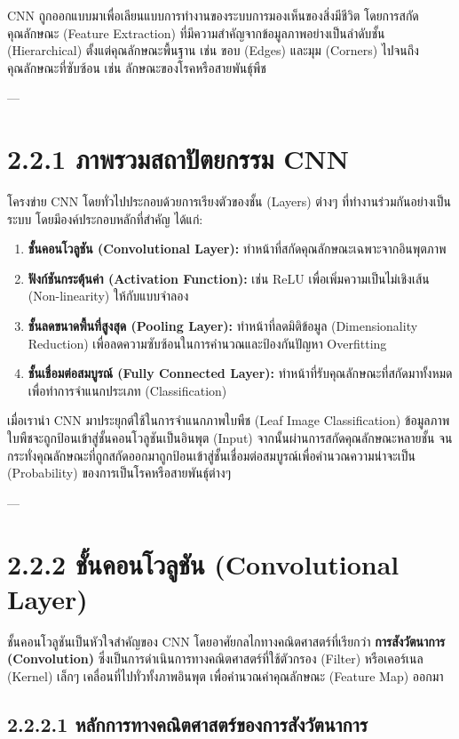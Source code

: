 \documentclass[11pt,a4paper,openany]{report}
\begin{document}
CNN ถูกออกแบบมาเพื่อเลียนแบบการทำงานของระบบการมองเห็นของสิ่งมีชีวิต โดยการสกัดคุณลักษณะ (Feature Extraction) ที่มีความสำคัญจากข้อมูลภาพอย่างเป็นลำดับชั้น (Hierarchical) ตั้งแต่คุณลักษณะพื้นฐาน เช่น ขอบ (Edges) และมุม (Corners) ไปจนถึงคุณลักษณะที่ซับซ้อน เช่น ลักษณะของโรคหรือสายพันธุ์พืช

---

\section{2.2.1 ภาพรวมสถาปัตยกรรม CNN}


โครงข่าย CNN โดยทั่วไปประกอบด้วยการเรียงตัวของชั้น (Layers) ต่างๆ ที่ทำงานร่วมกันอย่างเป็นระบบ โดยมีองค์ประกอบหลักที่สำคัญ ได้แก่:

\begin{enumerate}
  \item \textbf{ชั้นคอนโวลูชัน (Convolutional Layer):} ทำหน้าที่สกัดคุณลักษณะเฉพาะจากอินพุตภาพ
  \item \textbf{ฟังก์ชันกระตุ้นค่า (Activation Function):} เช่น ReLU เพื่อเพิ่มความเป็นไม่เชิงเส้น (Non-linearity) ให้กับแบบจำลอง
  \item \textbf{ชั้นลดขนาดพื้นที่สูงสุด (Pooling Layer):} ทำหน้าที่ลดมิติข้อมูล (Dimensionality Reduction) เพื่อลดความซับซ้อนในการคำนวณและป้องกันปัญหา Overfitting
  \item \textbf{ชั้นเชื่อมต่อสมบูรณ์ (Fully Connected Layer):} ทำหน้าที่รับคุณลักษณะที่สกัดมาทั้งหมดเพื่อทำการจำแนกประเภท (Classification)
\end{enumerate}


เมื่อเรานำ CNN มาประยุกต์ใช้ในการจำแนกภาพใบพืช (Leaf Image Classification) ข้อมูลภาพใบพืชจะถูกป้อนเข้าสู่ชั้นคอนโวลูชันเป็นอินพุต (Input) จากนั้นผ่านการสกัดคุณลักษณะหลายชั้น จนกระทั่งคุณลักษณะที่ถูกสกัดออกมาถูกป้อนเข้าสู่ชั้นเชื่อมต่อสมบูรณ์เพื่อคำนวณความน่าจะเป็น (Probability) ของการเป็นโรคหรือสายพันธุ์ต่างๆ

---

\section{2.2.2 ชั้นคอนโวลูชัน (Convolutional Layer)}


ชั้นคอนโวลูชันเป็นหัวใจสำคัญของ CNN โดยอาศัยกลไกทางคณิตศาสตร์ที่เรียกว่า \textbf{การสังวัตนาการ (Convolution)} ซึ่งเป็นการดำเนินการทางคณิตศาสตร์ที่ใช้ตัวกรอง (Filter) หรือเคอร์เนล (Kernel) เล็กๆ เคลื่อนที่ไปทั่วทั้งภาพอินพุต เพื่อคำนวณค่าคุณลักษณะ (Feature Map) ออกมา

\subsection{2.2.2.1 หลักการทางคณิตศาสตร์ของการสังวัตนาการ}
\end{document}
